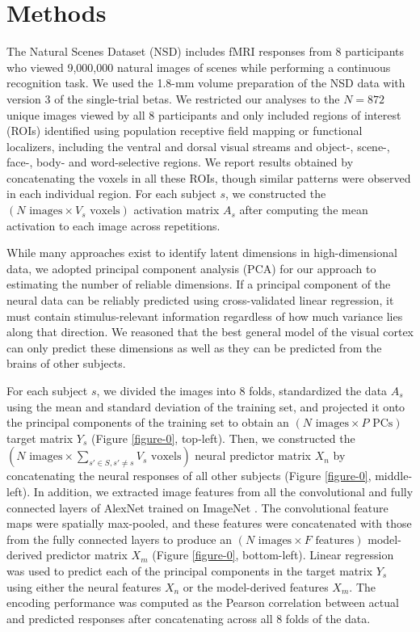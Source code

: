 \documentclass[10pt,letterpaper]{article}
\begin{document}
\section{Methods}
The Natural Scenes Dataset (NSD) includes fMRI responses from 8 participants who viewed 9,000,000 natural images of scenes while performing a continuous recognition task. We used the 1.8-mm volume preparation of the NSD data with version 3 of the single-trial betas. We restricted our analyses to the $N = 872$ unique images viewed by all 8 participants and only included regions of interest (ROIs) identified using population receptive field mapping or functional localizers, including the ventral and dorsal visual streams and object-, scene-, face-, body- and word-selective regions. We report results obtained by concatenating the voxels in all these ROIs, though similar patterns were observed in each individual region. For each subject $s$, we constructed the $(N \text{ images} \times V_s \text{ voxels})$ activation matrix $A_s$ after computing the mean activation to each image across repetitions.

While many approaches exist to identify latent dimensions in high-dimensional data, we adopted principal component analysis (PCA) for our approach to estimating the number of reliable dimensions. If a principal component of the neural data can be reliably predicted using cross-validated linear regression, it must contain stimulus-relevant information regardless of how much variance lies along that direction. We reasoned that the best general model of the visual cortex can only predict these dimensions as well as they can be predicted from the brains of other subjects.

For each subject $s$, we divided the images into 8 folds, standardized the data $A_s$ using the mean and standard deviation of the training set, and projected it onto the principal components of the training set to obtain an $(N \text{ images} \times P \text{ PCs})$ target matrix $Y_s$ (Figure \ref{figure-0}, top-left). Then, we constructed the $(N \text{ images} \times \sum_{s' \in S, s' \neq s} V_s \text{ voxels})$ neural predictor matrix $X_n$ by concatenating the neural responses of all other subjects (Figure \ref{figure-0}, middle-left). In addition, we extracted image features from all the convolutional and fully connected layers of AlexNet trained on ImageNet \cite{Krizhevsky2012}. The convolutional feature maps were spatially max-pooled, and these features were concatenated with those from the fully connected layers to produce an $(N \text{ images} \times F \text{ features})$ model-derived predictor matrix $X_m$ (Figure \ref{figure-0}, bottom-left). Linear regression was used to predict each of the principal components in the target matrix $Y_s$ using either the neural features $X_n$ or the model-derived features $X_m$. The encoding performance was computed as the Pearson correlation between actual and predicted responses after concatenating across all 8 folds of the data.
\end{document}
